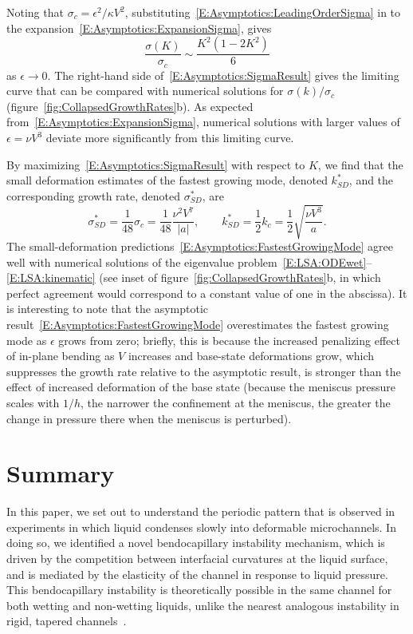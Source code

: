 \documentclass{jfm}
\newcommand{\aspect}{a} %
\begin{document}
Noting that $\sigma_c = \epsilon^2/\kappa V^2$, substituting~\eqref{E:Asymptotics:LeadingOrderSigma} in to the expansion~\eqref{E:Asymptotics:ExpansionSigma}, gives
\begin{equation}\label{E:Asymptotics:SigmaResult}
\frac{\sigma(K)}{\sigma_c} \sim  \frac{K^2\left(1-2K^2 \right)}{6}
\end{equation}
as $\epsilon \to 0$. The right-hand side of~\eqref{E:Asymptotics:SigmaResult} gives the limiting curve that can be compared with numerical solutions for $\sigma(k)/\sigma_c$ (figure~\ref{fig:CollapsedGrowthRates}b). As expected from~\eqref{E:Asymptotics:ExpansionSigma}, numerical solutions with larger values of $\epsilon = \nu V^3$ deviate more significantly from this limiting curve.

By maximizing~\eqref{E:Asymptotics:SigmaResult} with respect to $K$, we find that the small deformation estimates of the fastest growing mode, denoted $k^*_{SD}$, and the corresponding growth rate, denoted $\sigma^*_{SD}$, are
\begin{equation}\label{E:Asymptotics:FastestGrowingMode}
\sigma^*_{SD}= \frac{1}{48}\sigma_c = \frac{1}{48}\frac{\nu^2 V^7}{|\aspect|}, \qquad k^*_{SD}= \frac{1}{2}k_c = \frac{1}{2}\sqrt{\frac{\nu V^3}{\aspect}}.
\end{equation}
The small-deformation predictions~\eqref{E:Asymptotics:FastestGrowingMode} agree well with numerical solutions of the eigenvalue problem~\eqref{E:LSA:ODEwet}--\eqref{E:LSA:kinematic} (see inset of figure~\ref{fig:CollapsedGrowthRates}b, in which perfect agreement would correspond to a constant value of one in the abscissa). It is interesting to note that the asymptotic result~\eqref{E:Asymptotics:FastestGrowingMode} overestimates the fastest growing mode as $\epsilon$ grows from zero; briefly, this is because the increased penalizing effect of in-plane bending as $V$ increases and base-state deformations grow, which suppresses the growth rate relative to the asymptotic result, is stronger than the effect of increased deformation of the base state (because the meniscus pressure scales with $1/h$, the narrower the confinement at the meniscus, the greater the change in pressure there when the meniscus is perturbed).

\section{Summary}\label{S:Conclusion}
In this paper, we set out to understand the periodic pattern that is observed in experiments in which liquid condenses slowly into deformable microchannels. In doing so, we identified a novel bendocapillary instability mechanism, which is driven by the competition between interfacial curvatures at the liquid surface, and is mediated by the elasticity of the channel in response to liquid pressure. This bendocapillary instability is theoretically possible in the same channel for both wetting and non-wetting liquids, unlike the nearest analogous instability in rigid, tapered channels~\citep{AlHousseiny2012NaturePhysics}.
\end{document}
